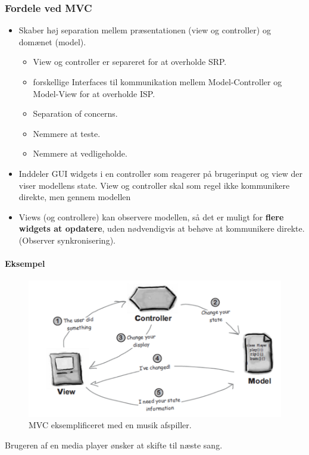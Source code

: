 \subsubsection{Fordele ved MVC}
\begin{itemize}
	\item Skaber høj separation mellem præsentationen (view og controller) og domænet (model).
	\begin{itemize}
		\item View og controller er separeret for at overholde SRP.
		\item forskellige Interfaces til kommunikation mellem Model-Controller og Model-View for at overholde ISP.
		\item Separation of concerns.
		\item Nemmere at teste.
		\item Nemmere at vedligeholde.
	\end{itemize}
	\item Inddeler GUI widgets i en controller som reagerer på brugerinput og view der viser modellens state. View og controller skal som regel ikke kommunikere direkte, men gennem modellen
	\item Views (og controllere) kan observere modellen, så det er muligt for \textbf{flere widgets at opdatere}, uden nødvendigvis at behøve at kommunikere direkte. (Observer synkronisering).
\end{itemize}

\paragraph{Eksempel}
\begin{figure}[H]
	\centering
	\includegraphics[width=0.8\linewidth]{figs/mvcExample}
	\caption{MVC eksemplificeret med en musik afspiller.}
	\label{fig:mvcExample}
\end{figure}

Brugeren af en media player ønsker at skifte til næste sang.

